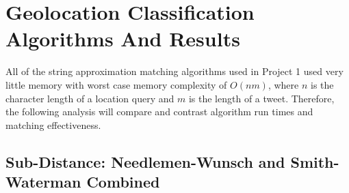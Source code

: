 \documentclass[11pt]{article}
\begin{document}
\section{Geolocation Classification Algorithms And Results}

All of the string approximation matching algorithms used in Project 1 used very little memory with worst case memory complexity of $O(nm)$, where $n$ is the character length of a location query and $m$ is the length of a tweet. Therefore, the following analysis will compare and contrast algorithm run times and matching effectiveness.    

\subsection{Sub-Distance: Needlemen-Wunsch and Smith-Waterman Combined}
\end{document}
